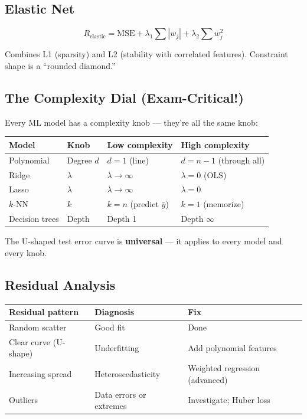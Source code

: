 \documentclass[11pt,a4paper]{article}
\begin{document}
\subsection{Elastic Net}

$$R_{\text{elastic}} = \text{MSE} + \lambda_1 \sum |w_j| + \lambda_2 \sum w_j^2$$

Combines L1 (sparsity) and L2 (stability with correlated features). Constraint shape is a ``rounded diamond.''

\subsection{The Complexity Dial (Exam-Critical!)}

Every ML model has a complexity knob --- they're all the same knob:

\begin{center}
\begin{tabular}{|l|l|l|l|}
\hline
\textbf{Model} & \textbf{Knob} & \textbf{Low complexity} & \textbf{High complexity} \\
\hline
Polynomial & Degree $d$ & $d=1$ (line) & $d=n-1$ (through all) \\
Ridge & $\lambda$ & $\lambda \to \infty$ & $\lambda = 0$ (OLS) \\
Lasso & $\lambda$ & $\lambda \to \infty$ & $\lambda = 0$ \\
$k$-NN & $k$ & $k=n$ (predict $\bar{y}$) & $k=1$ (memorize) \\
Decision trees & Depth & Depth 1 & Depth $\infty$ \\
\hline
\end{tabular}
\end{center}

The U-shaped test error curve is \textbf{universal} --- it applies to every model and every knob.

\subsection{Residual Analysis}

\begin{center}
\begin{tabular}{|l|l|l|}
\hline
\textbf{Residual pattern} & \textbf{Diagnosis} & \textbf{Fix} \\
\hline
Random scatter & Good fit & Done \\
Clear curve (U-shape) & Underfitting & Add polynomial features \\
Increasing spread & Heteroscedasticity & Weighted regression (advanced) \\
Outliers & Data errors or extremes & Investigate; Huber loss \\
\hline
\end{tabular}
\end{center}
\end{document}

